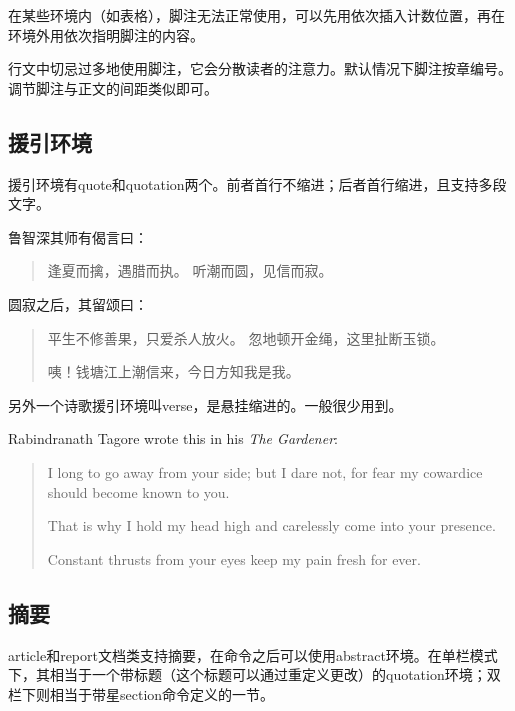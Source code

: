 {在某些环境内（如表格），脚注无法正常使用，可以先用\latexline{\\footnotemark}依次插入计数位置，再在环境外用\latexline{\\footnotetext}依次指明脚注的内容。

行文中切忌过多地使用脚注，它会分散读者的注意力。默认情况下脚注按章编号。调节脚注与正文的间距类似\latexline{\\setlength{\\skip\\footins}{0.5cm}}即可。

\subsection{援引环境}
援引环境有quote和quotation两个。前者首行不缩进；后者首行缩进，且支持多段文字。

\begin{codeshow}
鲁智深其师有偈言曰：
\begin{quote}
逢夏而擒，遇腊而执。
听潮而圆，见信而寂。
\end{quote}
圆寂之后，其留颂曰：
\begin{quotation}
平生不修善果，只爱杀人放火。
忽地顿开金绳，这里扯断玉锁。

咦！钱塘江上潮信来，今日方知我是我。
\end{quotation}
\end{codeshow}

另外一个诗歌援引环境叫verse，是悬挂缩进的。一般很少用到。

\begin{codeshow}
Rabindranath Tagore wrote this in his \emph{The Gardener}: 
\begin{verse}
I long to go away from your side; but 
I dare not, for fear my cowardice 
should become known to you. 

That is why I hold my head high and 
carelessly come into your presence. 

Constant thrusts from your eyes keep 
my pain fresh for ever.
\end{verse}
\end{codeshow}

\subsection{摘要}
article和report文档类支持摘要，在\latexline{\\maketitle}命令之后可以使用abstract环境。在单栏模式下，其相当于一个带标题（这个标题可以通过重定义\latexline{\\abstractname}更改）的quotation环境；双栏下则相当于带星section命令定义的一节。

}
